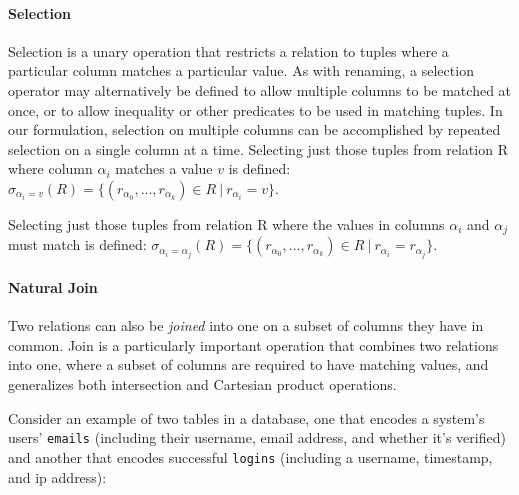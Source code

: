 \paragraph{Selection} Selection is a unary operation that restricts a relation to tuples where a particular column matches a particular value. As with renaming, a selection operator may alternatively be defined to allow multiple columns to be matched at once, or to allow inequality or other predicates to be used in matching tuples. In our formulation, selection on multiple columns can be accomplished by repeated selection on a single column at a time. Selecting just those tuples from relation R where column $\alpha_i$ matches a value $v$ is defined: \newline$\sigma_{\alpha_i = v}(R) = \{ (r_{\alpha_0}, \ldots, r_{\alpha_k}) \in R \ |\ r_{\alpha_i} = v \}$.

Selecting just those tuples from relation R where the values in columns $\alpha_i$ and $\alpha_j$ must match is defined: \newline$\sigma_{\alpha_i = \alpha_j}(R) = \{ (r_{\alpha_0}, \ldots, r_{\alpha_k}) \in R \ |\ r_{\alpha_i} = r_{\alpha_j} \}$.

\paragraph{Natural Join} Two relations can also be \textit{joined} into one on a subset of columns they have in common. Join is a particularly important operation that combines two relations into one, where a subset of columns are required to have matching values, and generalizes both intersection and Cartesian product operations.

Consider an example of two tables in a database, one that encodes a system's users' \texttt{emails} (including their username, email address, and whether it's verified) and another that encodes successful \texttt{logins} (including a username, timestamp, and ip address):

